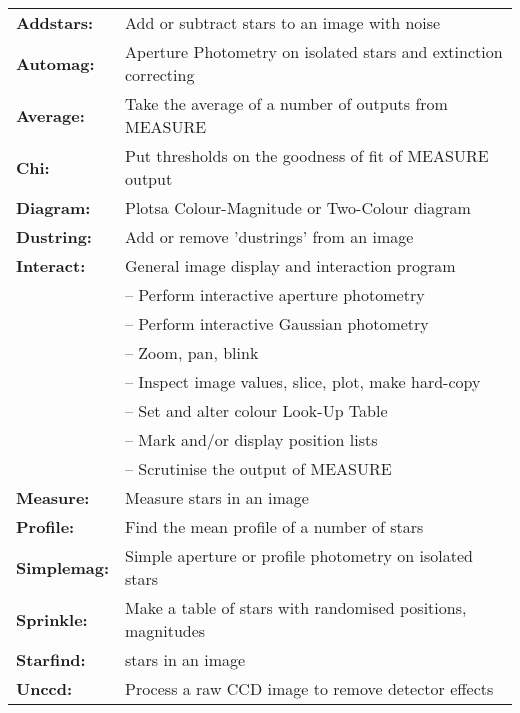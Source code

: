 \label{ap:summary}
\begin{tabular}{ll}
{\bf  Addstars:} &	Add or subtract stars to an image with noise \\
{\bf  Automag:} &	Aperture Photometry on isolated stars and extinction correcting \\
{\bf  Average:} &	Take the average of a number of outputs from MEASURE \\
{\bf  Chi:} &		Put thresholds on the goodness of fit of MEASURE output \\
{\bf  Diagram:} &	Plotsa Colour-Magnitude or Two-Colour diagram \\
{\bf  Dustring:} &      Add or remove 'dustrings' from an image \\
{\bf  Interact:} &      General image display and interaction program \\
                 &      \hspace{2ex} -- Perform interactive aperture photometry \\
                 &      \hspace{2ex} -- Perform interactive Gaussian photometry \\
                 &      \hspace{2ex} -- Zoom, pan, blink\\
                 &      \hspace{2ex} -- Inspect image values, slice, plot,  make hard-copy\\
                 &      \hspace{2ex} -- Set and alter colour Look-Up Table \\
                 &      \hspace{2ex} -- Mark and/or display position lists \\
                 &      \hspace{2ex} -- Scrutinise the output of MEASURE \\
{\bf  Measure:} &	Measure stars in an image \\
{\bf  Profile:} &	Find the mean profile of a number of stars \\
{\bf  Simplemag:} &	Simple aperture or profile photometry on isolated stars \\
{\bf  Sprinkle:} &      Make a table of stars with randomised positions, magnitudes \\
{\bf  Starfind:} &	stars in an image \\
{\bf  Unccd:} &         Process a raw CCD image to remove detector effects \\
\end{tabular}
 
